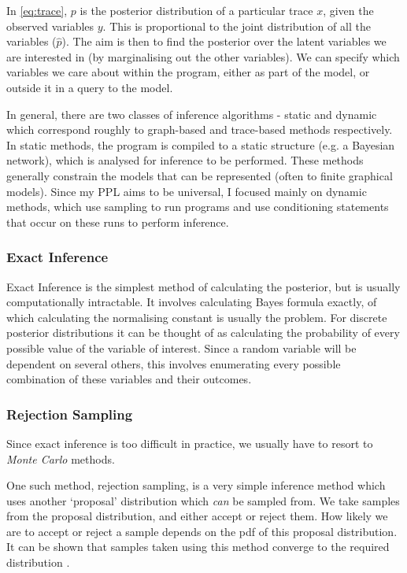 In \eqref{eq:trace}, $p$ is the posterior distribution of a particular trace $x$, given the observed variables $y$. This is proportional to the joint distribution of all the variables ($\hat{p}$). The aim is then to find the posterior over the latent variables we are interested in (by marginalising out the other variables). We can specify which variables we care about within the program, either as part of the model, or outside it in a query to the model.

In general, there are two classes of inference algorithms - static and dynamic \cite{gordon2014probabilistic} which correspond roughly to graph-based and trace-based methods respectively. In static methods, the program is compiled to a static structure (e.g. a Bayesian network), which is analysed for inference to be performed. These methods generally constrain the models that can be represented (often to finite graphical models). Since my PPL aims to be universal, I focused mainly on dynamic methods, which use sampling to run programs and use conditioning statements that occur on these runs to perform inference.

\subsubsection{Exact Inference}

Exact Inference is the simplest method of calculating the posterior, but is usually computationally intractable. It involves calculating Bayes formula exactly, of which calculating the normalising constant is usually the problem. For discrete posterior distributions it can be thought of as calculating the probability of every possible value of the variable of interest. Since a random variable will be dependent on several others, this involves enumerating every possible combination of these variables and their outcomes.

\subsubsection{Rejection Sampling}
			
Since exact inference is too difficult in practice, we usually have to resort to \textit{Monte Carlo} \cite{monte-carlo} methods.
		
One such method, rejection sampling, is a very simple inference method which uses another `proposal' distribution which \textit{can} be sampled from. We take samples from the proposal distribution, and either accept or reject them. How likely we are to accept or reject a sample depends on the pdf of this proposal distribution. It can be shown that samples taken using this method converge to the required distribution \cite{flury1990acceptance}. 
		
